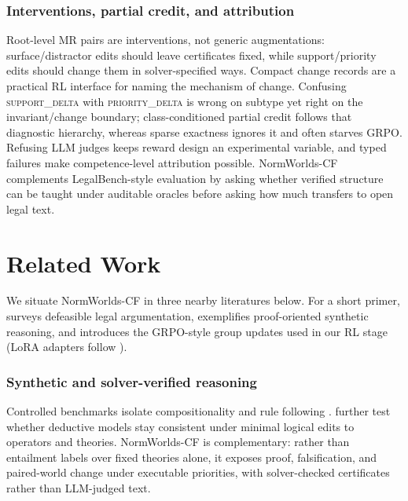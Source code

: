 \documentclass[letterpaper]{article}
\newcommand{\dataset}{NormWorlds-CF}
\newcommand{\lab}[1]{\textsc{#1}}
\begin{document}
\subsubsection{Interventions, partial credit, and attribution}
Root-level MR pairs are interventions, not generic augmentations: surface/distractor edits should leave certificates fixed, while support/priority edits should change them in solver-specified ways. Compact change records are a practical RL interface for naming the mechanism of change. Confusing \lab{support\_delta} with \lab{priority\_delta} is wrong on subtype yet right on the invariant/change boundary; class-conditioned partial credit follows that diagnostic hierarchy, whereas sparse exactness ignores it and often starves GRPO. Refusing LLM judges keeps reward design an experimental variable, and typed failures make competence-level attribution possible. \dataset{} complements LegalBench-style evaluation by asking whether verified structure can be taught under auditable oracles before asking how much transfers to open legal text.

\section{Related Work}

We situate \dataset{} in three nearby literatures below. For a short primer, \citet{prakken2015law} surveys defeasible legal argumentation, \citet{tafjord2021proofwriter} exemplifies proof-oriented synthetic reasoning, and \citet{shao2024deepseekmath} introduces the GRPO-style group updates used in our RL stage (LoRA adapters follow \cite{hu2021lora}).

\subsubsection{Synthetic and solver-verified reasoning}
Controlled benchmarks isolate compositionality and rule following \cite{weston2015babi,johnson2017clevr,clark2020transformers,tafjord2021proofwriter}. \citet{sanyal2022robustlr} further test whether deductive models stay consistent under minimal logical edits to operators and theories. \dataset{} is complementary: rather than entailment labels over fixed theories alone, it exposes proof, falsification, and paired-world change under executable priorities, with solver-checked certificates rather than LLM-judged text.
\end{document}
